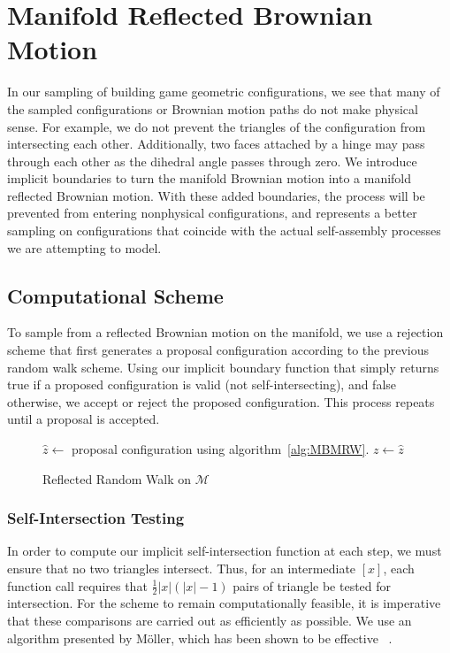 \section{Manifold Reflected Brownian Motion}
In our sampling of building game geometric configurations, we see that many of the sampled configurations or Brownian motion paths do not make physical sense. For example, we do not prevent the triangles of the configuration from intersecting each other. Additionally, two faces attached by a hinge may pass through each other as the dihedral angle passes through zero. We introduce implicit boundaries to turn the manifold Brownian motion into a manifold reflected Brownian motion. With these added boundaries, the process will be prevented from entering nonphysical configurations, and represents a better sampling on configurations that coincide with the actual self-assembly processes we are attempting to model.

\subsection{Computational Scheme}

To sample from a reflected Brownian motion on the manifold, we use a rejection scheme that first generates a proposal configuration according to the previous random walk scheme. Using our implicit boundary function that simply returns true if a proposed configuration is valid (not self-intersecting), and false otherwise, we accept or reject the proposed configuration. This process repeats until a proposal is accepted. 

\begin{figure}[ht]
\centering
\begin{algorithmic}
\Do 
\State $\hat{z} \gets$ proposal configuration using algorithm~\ref{alg:MBMRW}.
\State $z \gets \hat{z}$
\end{algorithmic}
\caption{Reflected Random Walk on $\mathcal{M}$}
\end{figure}

\subsubsection{Self-Intersection Testing}

In order to compute our implicit self-intersection function at each step, we must ensure that no two triangles intersect. Thus, for an intermediate $[x]$, each function call requires that $\frac{1}{2}|x|(|x| - 1)$ pairs of triangle be tested for intersection. For the scheme to remain computationally feasible, it is imperative that these comparisons are carried out as efficiently as possible. We use an algorithm presented by M\"oller, which has been shown to be effective ~\cite{Möller97afast}.

